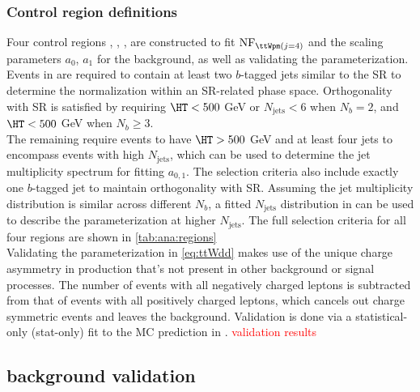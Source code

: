 \documentclass[../thesis.tex]{subfiles}
\begin{document}
\subsubsection*{Control region definitions}
Four control regions \CRttWp, \CRttWm, \CRonebp, \CRonebm are constructed to fit $\mathrm{NF}_{\ttWpm(j=4)}$ and the scaling parameters $a_0$, $a_1$ for the \ttW background, as well as validating the parameterization.\\
Events in \CRttWpm are required to contain at least two $b$-tagged jets similar to the SR to determine the \ttW normalization within an SR-related phase space. Orthogonality with SR is satisfied by requiring $\HT<500$ GeV or $N_\mathrm{jets}<6$ when $N_b=2$, and $\HT<500$ GeV when $N_b\geq 3$.\\
The remaining \CRonebpm require events to have $\HT>500$ GeV and at least four jets to encompass events with high $N_\mathrm{jets}$, which can be used to determine the \ttW jet multiplicity spectrum for fitting $a_{0,1}$. The selection criteria also include exactly one $b$-tagged jet to maintain orthogonality with SR. Assuming the \ttW jet multiplicity distribution is similar across different $N_b$, a fitted $N_\mathrm{jets}$ distribution in \CRonebpm can be used to describe the \ttW parameterization at higher $N_\mathrm{jets}$. The full selection criteria for all four regions are shown in \autoref{tab:ana:regions}\\

Validating the \ttW parameterization in \autoref{eq:ttWdd} makes use of the unique charge asymmetry in \ttW production that's not present in other background or signal processes. The number of events with all negatively charged leptons is subtracted from that of events with all positively charged leptons, which cancels out charge symmetric events and leaves the \ttW background. Validation is done via a statistical-only (stat-only) fit to the \ttW MC prediction in \CRonebpm. \textcolor{red}{validation results}


\subsection{\ttZ background validation}
\end{document}

